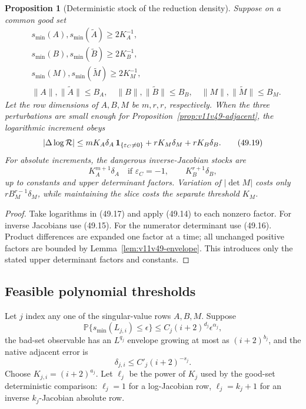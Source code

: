 \documentclass[11pt]{article}
\newtheorem{proposition}[theorem]{Proposition}
\begin{document}
\begin{proposition}[Deterministic stock of the reduction density]
\label{prop:v11v49-stock}
Suppose on a common good set
\[
\begin{split}
 &s_{\min}(A),s_{\min}(\widetilde A)\ge2K_A^{-1},\\
 &s_{\min}(B),s_{\min}(\widetilde B)\ge2K_B^{-1},\\
 &s_{\min}(M),s_{\min}(\widetilde M)\ge2K_M^{-1},              \tag{49.18}\\
 &\lVert A\rVert,\lVert\widetilde A\rVert\le B_A,\quad
  \lVert B\rVert,\lVert\widetilde B\rVert\le B_B,\quad
  \lVert M\rVert,\lVert\widetilde M\rVert\le B_M.
\end{split}
\]
Let the row dimensions of \(A,B,M\) be \(m,r,r\), respectively.
When the three perturbations are small enough for
Proposition~\ref{prop:v11v49-adjacent}, the logarithmic increment obeys
\[
 |\Delta\log{\cal R}|
 \le mK_A\delta_A\,\mathbf1_{\{\varepsilon_C\ne0\}}
       +rK_M\delta_M+rK_B\delta_B.                             \tag{49.19}
\]
For absolute increments, the dangerous inverse-Jacobian stocks are
\[
                   K_A^{m+1}\delta_A
       \quad\text{if }\varepsilon_C=-1,\qquad
                   K_B^{r+1}\delta_B,                         \tag{49.20}
\]
up to constants and upper determinant factors.  Variation of
\(|\det M|\) costs only
\(rB_M^{r-1}\delta_M\), while maintaining the slice costs the separate
threshold \(K_M\).
\end{proposition}

\begin{proof}
Take logarithms in (49.17) and apply (49.14) to each nonzero factor.
For inverse Jacobians use (49.15).  For the numerator determinant use
(49.16).  Product differences are expanded one factor at a time; all
unchanged positive factors are bounded by
Lemma~\ref{lem:v11v49-envelope}.  This introduces only the stated
upper determinant factors and constants.
\end{proof}

\subsection{Feasible polynomial thresholds}

Let \(j\) index any one of the singular-value rows \(A,B,M\).  Suppose
\[
 \mathbb P\{s_{\min}(L_{j,i})\le\epsilon\}
       \le C_j(i+2)^{d_j}\epsilon^{\alpha_j},                 \tag{49.21}
\]
the bad-set observable has an \(L^{q_j}\) envelope growing at most as
\((i+2)^{b_j}\), and the native adjacent error is
\[
                         \delta_{j,i}\le C'_j(i+2)^{-s_j}.     \tag{49.22}
\]
Choose \(K_{j,i}=(i+2)^{a_j}\).  Let \(\ell_j\) be the power of \(K_j\)
used by the good-set deterministic comparison: \(\ell_j=1\) for a
log-Jacobian row, \(\ell_j=k_j+1\) for an inverse \(k_j\)-Jacobian
absolute row.
\end{document}
